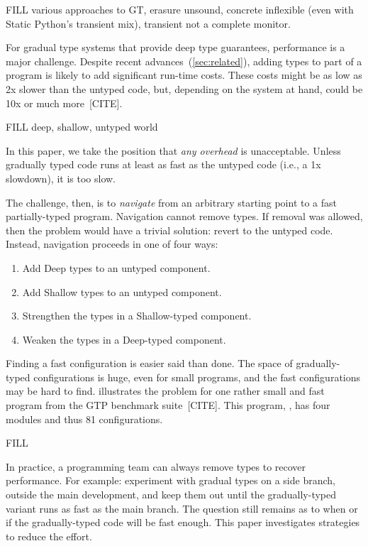 FILL various approaches to GT,
erasure unsound,
concrete inflexible (even with Static Python's transient mix),
transient not a complete monitor.

For gradual type systems that provide deep type guarantees,
performance is a major challenge.
Despite recent advances~(\cref{sec:related}), adding types to part of a program
is likely to add significant run-time costs.
These costs might be as low as 2x slower than the untyped code, but, depending
on the system at hand, could be 10x or much more~[CITE].

FILL deep, shallow, untyped world

In this paper, we take the position that \emph{any overhead} is unacceptable.
Unless gradually typed code runs at least as fast as the untyped code
(i.e., a 1x slowdown), it is too slow.

The challenge, then, is to \emph{navigate} from an arbitrary starting point
to a fast partially-typed program.
Navigation cannot remove types.
If removal was allowed, then the problem would have a trivial solution: revert
to the untyped code.
Instead, navigation proceeds in one of four ways:
\begin{enumerate}
  \item
    Add Deep types to an untyped component.
  \item
    Add Shallow types to an untyped component.
  \item
    Strengthen the types in a Shallow-typed component.
  \item
    Weaken the types in a Deep-typed component.
\end{enumerate}

Finding a fast configuration is easier said than done.
The space of gradually-typed configurations is huge, even for
small programs, and the fast configurations may be hard to find.
 illustrates the problem for one
rather small and fast program from the GTP benchmark suite~[CITE].
This program, , has four modules and thus 81 configurations.

FILL


In practice, a programming team can always remove types to recover performance.
For example: experiment with gradual types on a side branch, outside the main
development, and keep them out until the gradually-typed variant runs as fast
as the main branch.
The question still remains as to when or if the gradually-typed code will be
fast enough.
This paper investigates strategies to reduce the effort.


